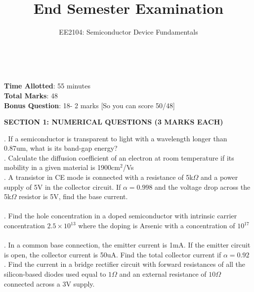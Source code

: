 \documentclass[12pt]{article}\date{}
\begin{document}
\title{End Semester Examination}
\maketitle
\begin{center}
\begin{large}
\author{EE2104: Semiconductor Device Fundamentals} \\[30pt]
\end{large}
\end{center} 
\textbf{Time Allotted}: 55 minutes \\
\textbf{Total Marks}: 48 \\
\textbf{Bonus Question}: 18- 2 marks [So you can score 50/48] \\[30pt]

\begin{large}
\textbf{SECTION 1: NUMERICAL QUESTIONS (3 MARKS EACH)} \\[30pt] 
\end{large}

. If a semiconductor is transparent to light with a wavelength longer than 0.87um, what is its band-gap energy? \\

. Calculate the diffusion coefficient of an electron at room temperature if its mobility in a given material is 1900cm$^2$/Vs \\

. A transistor in CE mode is connected with a resistance of 5k$\Omega$ and a power supply of 5V in the collector circuit. If $\alpha =0.998$ and the voltage drop across the 5k$\Omega$ resistor is 5V, find the base current. \\ \\
.  Find the hole concentration in a doped semiconductor with intrinsic carrier concentration $2.5 \times 10^{13}$ where the doping is Arsenic with a concentration of $10^{17}$ \\ \\
. In a common base connection, the emitter current is 1mA. If the emitter circuit is open, the collector current is 50uA. Find the total collector current if $\alpha =0.92$\\

. Find the current in a bridge rectifier circuit with forward resistances of all the silicon-based diodes used equal to $1 \Omega$ and an external resistance of $10 \Omega$ connected across a 3V supply.\\ [30pt]
\end{document}
